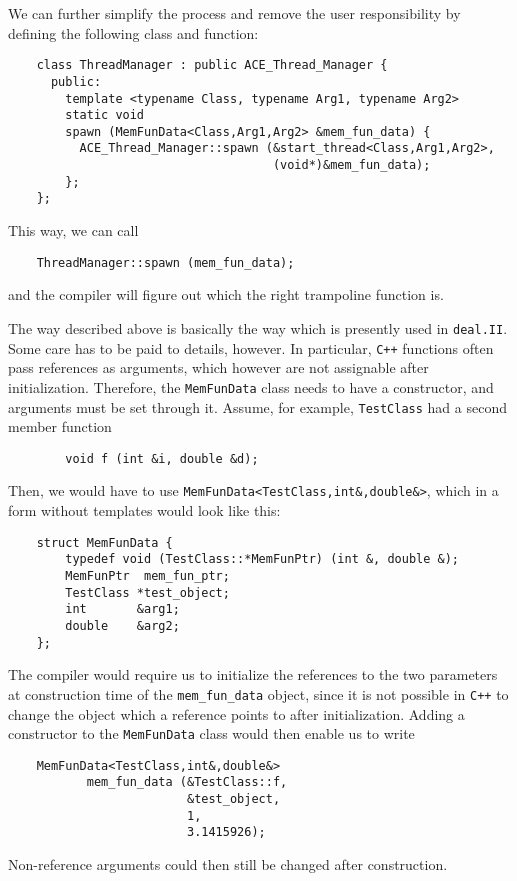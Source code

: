 \documentclass[11pt]{article}
\begin{document}
We can further simplify the process and remove the user responsibility by
defining the following class and function:
\begin{verbatim}
    class ThreadManager : public ACE_Thread_Manager {
      public:
        template <typename Class, typename Arg1, typename Arg2>
        static void 
        spawn (MemFunData<Class,Arg1,Arg2> &mem_fun_data) {
          ACE_Thread_Manager::spawn (&start_thread<Class,Arg1,Arg2>,
                                     (void*)&mem_fun_data);
        };
    };
\end{verbatim}
This way, we can call
\begin{verbatim}
    ThreadManager::spawn (mem_fun_data);
\end{verbatim}
and the compiler will figure out which the right trampoline function is.

The way described above is basically the way which is presently used in
\texttt{deal.II}. Some care has to be paid to details, however. In particular,
\texttt{C++} functions often pass references as arguments, which however are
not assignable after initialization. Therefore, the \texttt{MemFunData} class
needs to have a constructor, and arguments must be set through it. Assume, for
example, \texttt{TestClass} had a second member function
\begin{verbatim}
        void f (int &i, double &d);
\end{verbatim}
Then, we would have to use \texttt{MemFunData<TestClass,int\&,double\&>},
which in a form without templates would look like this:
\begin{verbatim}
    struct MemFunData {
        typedef void (TestClass::*MemFunPtr) (int &, double &);
        MemFunPtr  mem_fun_ptr;
        TestClass *test_object;
        int       &arg1;
        double    &arg2;
    };
\end{verbatim}
The compiler would require us to initialize the references to the two
parameters at construction time of the \texttt{mem\_fun\_data} object, since
it is not possible in \texttt{C++} to change the object which a reference
points to after initialization. Adding a constructor to the
\texttt{MemFunData} class would then enable us to write
\begin{verbatim}
    MemFunData<TestClass,int&,double&>  
           mem_fun_data (&TestClass::f,
                         &test_object,
                         1,
                         3.1415926);
\end{verbatim}
Non-reference arguments could then still be changed after construction.
\end{document}
